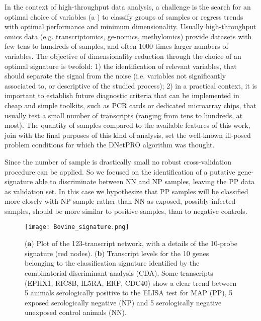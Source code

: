 \documentclass{standalone}
\begin{document}
In the context of high-throughput data analysis, a challenge is the search for an optimal choice of variables (a ) to classify groups of samples or regress trends with optimal performance and minimum dimensionality.
Usually high-throughput omics data (e.g. transcriptomics, ge-nomics, methylomics) provide datasets with few tens to hundreds of samples, and often 1000 times larger numbers of variables.
The objective of dimensionality reduction through the choice of an optimal signature is twofold: 1) the identification of relevant variables, that should separate the signal from the noise (i.e. variables not significantly associated to, or descriptive of the studied process); 2) in a practical context, it is important to establish future diagnostic criteria that can be implemented in cheap and simple toolkits, such as PCR cards or dedicated microarray chips, that usually test a small number of transcripts (ranging from tens to hundreds, at most).
The quantity of samples compared to the available features of this work, join with the final purposes of this kind of analysis, set the well-known ill-posed problem conditions for which the DNetPRO algorithm was thought.

Since the number of sample is drastically small no robust cross-validation procedure can be applied.
So we focused on the identification of a putative gene-signature able to discriminate between NN and NP samples, leaving the PP data as validation set.
In this case we hypothesize that PP samples will be classified more closely with NP sample rather than NN as exposed, possibly infected samples, should be more similar to positive samples, than to negative controls.

\begin{figure}[htbp]
\centering
\texttt{[image: Bovine\_signature.png]}
\qquad\qquad
\def\svgwidth{0.45\textwidth}

\caption[Caption Bovine]{(\textbf{a}) Plot of the 123-transcript network, with a details of the 10-probe signature (red nodes)\footnotemark.
(\textbf{b}) Transcript levels for the 10 genes belonging to the classification signature identified by the combinatorial discriminant analysis (CDA).
Some transcripts (EPHX1, RIC8B, IL5RA, ERF, CDC40) show a clear trend  between 5 animals serologically positive to the ELISA test for MAP (PP), 5 exposed serologically negative (NP) and 5 serologically negative unexposed control animals (NN).
}
\label{fig:bovine_signature}
\end{figure}
\end{document}
